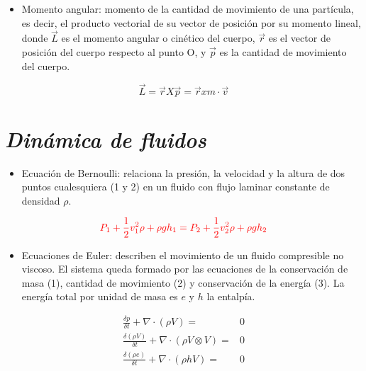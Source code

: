 \documentclass[letterpaper,12pt]{article}
\begin{document}
     \begin{itemize}
    \item [\ding{40}]
    \small{Momento angular: momento de la cantidad de movimiento de una partícula, es decir, el producto vectorial de su vector de posición por su momento lineal, donde $\vec{L}$ es el momento angular o cinético del cuerpo, $\vec{r}$ es el vector de posición del cuerpo respecto al punto O, y $\vec{p}$ es la cantidad de movimiento del cuerpo.}
    \end{itemize}
    \begin{equation*}%
    \vec{L}=\vec{r}X\vec{p}=\vec{r}xm\cdot \vec{v}
    \end{equation*}\vspace{3cm}
    
\section{\textit{Dinámica de fluidos}}%
    \begin{itemize}
    \item [\ding{106}]
    \small{Ecuación de Bernoulli: relaciona la presión, la velocidad y la altura de dos puntos cualesquiera (1 y 2) en un fluido con flujo laminar constante de densidad $\rho$}.
    \end{itemize}
    \begin{equation*}%
    \textcolor{red}{P_1+\frac{1}{2}v^2_1\rho+\rho gh_1=P_2+\frac{1}{2}v^2_2\rho+\rho gh_2}
\end{equation*}

     \begin{itemize}
    \item [\ding{109}]
    \small{Ecuaciones de Euler: describen el movimiento de un fluido compresible no viscoso. El sistema queda formado por las ecuaciones de la conservación de masa (1), cantidad de movimiento (2) y conservación de la energía (3). La energía total por unidad de masa es $e$ y $h$ la entalpía}.
    \end{itemize}
    \begin{align}
    \frac{\delta p}{\delta t}+\nabla\cdot(\rho V)=&0\\
    \frac{\delta (\rho V)}{\delta t}+\nabla\cdot(\rho V\otimes  V)=&0\\
    \frac{\delta (\rho e)}{\delta t}+\nabla\cdot(\rho hV)=&0
    \end{align}
\end{document}
